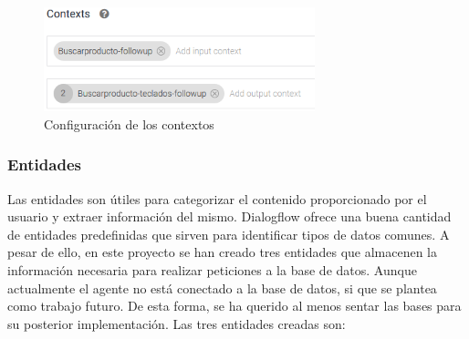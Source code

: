 \begin{figure}[ht]
	\begin{center}
		\includegraphics[width = 0.70\textwidth]{Figuras/contexts.PNG}
	\end{center}
	\caption{\label{fig:contextos} Configuración de los contextos}
\end{figure}

\newpage

\subsubsection{Entidades}

Las entidades son útiles para categorizar el contenido proporcionado por el usuario y extraer información del mismo. Dialogflow ofrece una buena cantidad de entidades predefinidas que sirven para identificar tipos de datos comunes. A pesar de ello, en este proyecto se han creado tres entidades que almacenen la información necesaria para realizar peticiones a la base de datos. Aunque actualmente el agente no está conectado a la base de datos, si que se plantea como trabajo futuro. De esta forma, se ha querido al menos sentar las bases para su posterior implementación. Las tres entidades creadas son:


